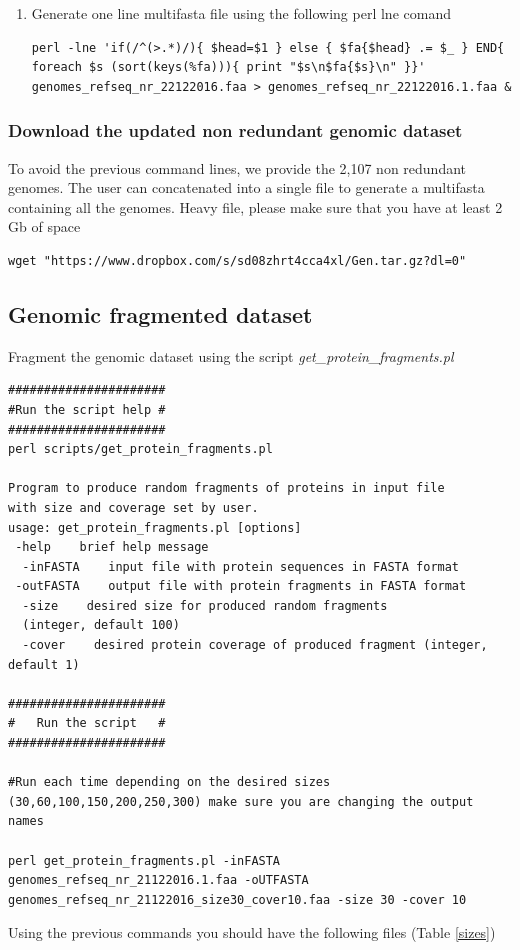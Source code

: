 \documentclass[12pt]{report}
\begin{document}
\begin{enumerate}
\item Generate one line multifasta file using the following perl lne comand
\begin{verbatim}
perl -lne 'if(/^(>.*)/){ $head=$1 } else { $fa{$head} .= $_ } END{ 
foreach $s (sort(keys(%fa))){ print "$s\n$fa{$s}\n" }}' 
genomes_refseq_nr_22122016.faa > genomes_refseq_nr_22122016.1.faa & 
\end{verbatim}
\end{enumerate}

\subsubsection{Download the updated non redundant genomic dataset}
To avoid the previous command lines, we  provide the 2,107 non redundant genomes. The user can concatenated into a single file to generate a multifasta containing all the genomes.  Heavy file, please make sure that you have at least 2 Gb of space

\begin{verbatim}
wget "https://www.dropbox.com/s/sd08zhrt4cca4xl/Gen.tar.gz?dl=0"
\end{verbatim}


\subsection{Genomic fragmented dataset}

Fragment the genomic dataset using the script \textit{get\_protein\_fragments.pl}

\begin{verbatim}
######################
#Run the script help #
######################
perl scripts/get_protein_fragments.pl 

Program to produce random fragments of proteins in input file 
with size and coverage set by user.
usage: get_protein_fragments.pl [options] 
 -help    brief help message
  -inFASTA    input file with protein sequences in FASTA format
 -outFASTA    output file with protein fragments in FASTA format
  -size    desired size for produced random fragments    
  (integer, default 100)
  -cover    desired protein coverage of produced fragment (integer, default 1) 

######################
#   Run the script   #
######################

#Run each time depending on the desired sizes 
(30,60,100,150,200,250,300) make sure you are changing the output names

perl get_protein_fragments.pl -inFASTA 
genomes_refseq_nr_21122016.1.faa -oUTFASTA 
genomes_refseq_nr_21122016_size30_cover10.faa -size 30 -cover 10 
\end{verbatim}
Using the previous commands you should have the following files (Table \ref{sizes}) 
\end{document}
